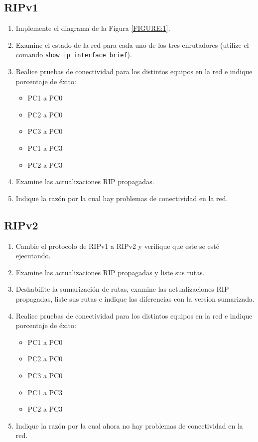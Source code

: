\documentclass[11pt]{utalcaDoc}
\begin{document}
\subsection{RIPv1}
\begin{enumerate}
  \item {Implemente el diagrama de la Figura \ref{FIGURE:1}.}
  \item {Examine el estado de la red para cada uno de los tres enrutadores (utilize el comando \texttt{show ip interface brief}).}
  \item {Realice pruebas de conectividad para los distintos equipos en la red e indique porcentaje de éxito:
    \begin{itemize}
      \item {PC1 a PC0}
      \item {PC2 a PC0}
      \item {PC3 a PC0}
      \item {PC1 a PC3}
      \item {PC2 a PC3}
    \end{itemize}
  }
  \item Examine las actualizaciones RIP propagadas.
  \item Indique la razón por la cual hay problemas de conectividad en la red.
\end{enumerate}

\subsection{RIPv2}
\begin{enumerate}
  \item{Cambie el protocolo de RIPv1 a RIPv2 y verifique que este se esté ejecutando.}
  \item Examine las actualizaciones RIP propagadas y liste sus rutas.
  \item Deshabilite la sumarización de rutas, examine las actualizaciones RIP propagadas, liste sus rutas e indique las diferencias con la version sumarizada.
  \item {Realice pruebas de conectividad para los distintos equipos en la red e indique porcentaje de éxito:
    \begin{itemize}
      \item {PC1 a PC0}
      \item {PC2 a PC0}
      \item {PC3 a PC0}
      \item {PC1 a PC3}
      \item {PC2 a PC3}
    \end{itemize}
  }
  \item Indique la razón por la cual ahora no hay problemas de conectividad en la red.
\end{enumerate}
\end{document}

